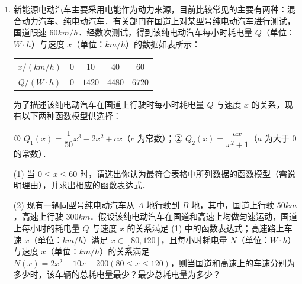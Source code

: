 \documentclass[a4paper,11pt]{article}
\begin{document}
\begin{enumerate}
(2) 若 $m=-1,a=2$，求 $f(2x)-2f(x)-3>0$ 的解集．

\ifanswer
\solbegin
{}
\solend
\fi

\item 新能源电动汽车主要采用电能作为动力来源，目前比较常见的主要有两种：混合动力汽车、纯电动汽车．有关部门在国道上对某型号纯电动汽车进行测试，国道限速 $60km/h$．经数次测试，得到该纯电动汽车每小时耗电量 $Q$（单位：$W\cdot h$）与速度 $x$（单位：$km/h$）的数据如表所示：

\begin{center}
\begin{tabular}{|c|c|c|c|c|}
\hline
$x/(km/h)$ & $0$ & $10$ & $40$ & $60$ \\
\hline
$Q/(W\cdot h)$ & $0$ & $1420$ & $4480$ & $6720$ \\
\hline
\end{tabular}
\end{center}

为了描述该纯电动汽车在国道上行驶时每小时耗电量 $Q$ 与速度 $x$ 的关系，现有以下两种函数模型供选择：

① $Q_1(x)=\dfrac1{50}x^3-2x^2+cx$（$c$ 为常数）；② $Q_2(x)=\dfrac{ax}{x^2+1}$（$a$ 为大于 $0$ 的常数）．

(1) 当 $0\leqslant x\leqslant60$ 时，请选出你认为最符合表格中所列数据的函数模型（需说明理由），并求出相应的函数表达式．

(2) 现有一辆同型号纯电动汽车从 $A$ 地行驶到 $B$ 地，其中，国道上行驶 $50km$，高速上行驶 $300km$．假设该纯电动汽车在国道和高速上均做匀速运动，国道上每小时的耗电量 $Q$ 与速度 $x$ 的关系满足 (1) 中的函数表达式；高速路上车速 $x$（单位：$km/h$）满足 $x\in[80,120]$，且每小时耗电量 $N$（单位：$W\cdot h$）与速度 $x$（单位：$km/h$）的关系满足 $N(x)=2x^2-10x+200(80\leqslant x\leqslant120)$，则当国道和高速上的车速分别为多少时，该车辆的总耗电量最少？最少总耗电量为多少？


\end{enumerate}
\end{document}
